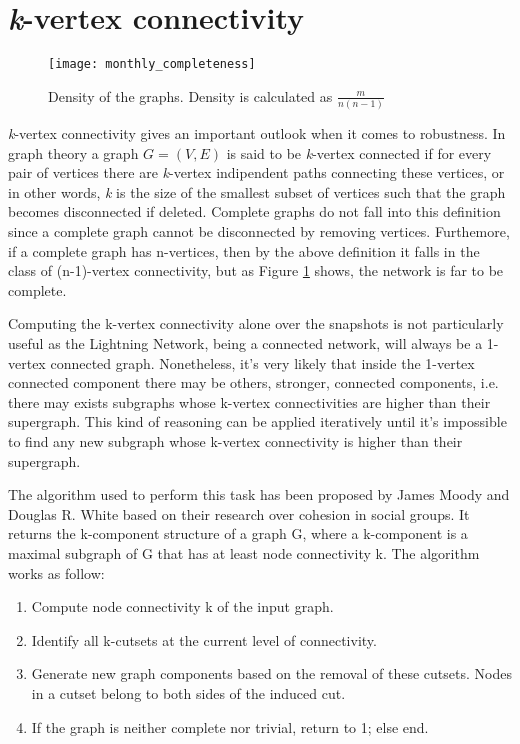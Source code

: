 	\section{\textit{k}-vertex connectivity}

	\begin{figure}
		\centering
		\texttt{[image: monthly\_completeness]}
		\caption{Density of the graphs. Density is calculated as $\frac{m}{n(n-1)}$}
		\label{monthly_completeness}
	\end{figure}
	
	\textit{k}-vertex connectivity gives an important outlook when it comes to robustness. In graph theory a graph $G = (V,E)$ is said to be \textit{k}-vertex connected if for every pair of vertices there are \textit{k}-vertex indipendent paths connecting these vertices, or in other words, \textit{k} is the size of the smallest subset of vertices such that the graph becomes disconnected if deleted. Complete graphs do not fall into this definition since a complete graph cannot be disconnected by removing vertices. Furthemore, if a complete graph has n-vertices, then by the above definition it falls in the class of (n-1)-vertex connectivity, but as Figure \ref{monthly_completeness} shows, the network is far to be complete.

	Computing the k-vertex connectivity alone over the snapshots is not particularly useful as the Lightning Network, being a connected network, will always be a 1-vertex connected graph. Nonetheless, it's very likely that inside the 1-vertex connected component there may be others, stronger, connected components, i.e. there may exists subgraphs whose k-vertex connectivities are higher than their supergraph. This kind of reasoning can be applied iteratively until it's impossible to find any new subgraph whose k-vertex connectivity is higher than their supergraph.
	
	The algorithm used to perform this task has been proposed by James Moody and Douglas R. White \cite{Moody2003} based on their research over cohesion in social groups. It returns the k-component structure of a graph G, where a k-component is a maximal subgraph of G that has at least node connectivity k. The algorithm works as follow:
	\begin{enumerate}
		\item Compute node connectivity k of the input graph.
		\item Identify all k-cutsets at the current level of connectivity. 
		\item Generate new graph components based on the removal of these cutsets. Nodes in a cutset belong to both sides of the induced cut.
		\item If the graph is neither complete nor trivial, return to 1; else end.
	\end{enumerate}
	

